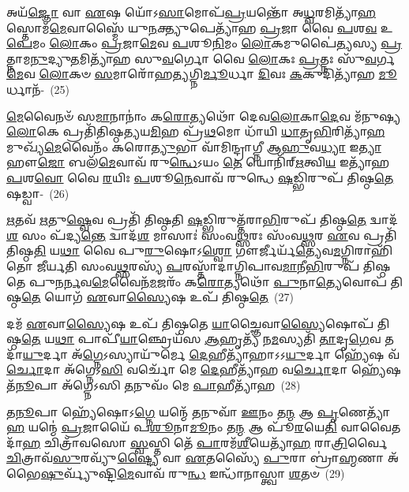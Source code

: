 {\anuvakamend[{\-\ul{𑌭𑍂}\-\-\ul{𑌯𑌾}\-\-\ul{𑌸𑍍𑌤} \ul{𑌸𑍍𑌵}\-𑌸𑍍𑌤𑌯𑍇\-𑌽𑌗𑍍𑌨𑍇᳴ 𑌪𑍁𑌷𑍍𑌯𑌾𑌸𑌂 \ul{𑌧𑍃}\-𑌷𑌦𑍍𑌵᳴\-\ul{𑌰𑍍𑌣}\-𑌮𑍇\-\ul{𑌕𑌾}\-𑌨𑍍𑌨\-\ul{𑌤𑍍𑌰𑌿}\-\-\ul{𑍞}\-𑌶𑌚𑍍𑌚᳴}]}%

𑌅𑌯᳴\-\ul{𑌜𑍍𑌞𑍋} 𑌵𑌾 \ul{𑌏}\-𑌷 𑌯𑍋᳴\-𑌽\-\ul{𑌸𑌾}\-𑌮𑍋𑌪᳴\-\ul{𑌪𑍍𑌰}\-𑌯𑌨𑍍𑌤𑍋᳴ 𑌅\-\ul{𑌧𑍍𑌵}\-𑌰𑌮𑌿𑌤𑍍𑌯𑌾᳴\-\ul{𑌹} 𑌸𑍍𑌤𑍋𑌮᳴\-\ul{𑌮𑍇}\-𑌵𑌾𑌸𑍍𑌮𑍈᳴ 𑌯𑍁\-\ul{𑌨}\-𑌕𑍍𑌤𑍍𑌯𑍁𑌪𑍇𑌤𑍍𑌯𑌾᳴𑌹 \ul{𑌪𑍍𑌰}\-𑌜𑌾 𑌵𑍈 \ul{𑌪}\-𑌶\-\ul{𑌵} 𑌉\-\ul{𑌪𑍇}\-𑌮𑌂 \ul{𑌲𑍋}\-𑌕𑌂 \ul{𑌪𑍍𑌰}\-𑌜𑌾\-\ul{𑌮𑍇}\-𑌵 \ul{𑌪}\-𑌶𑍂\-\ul{𑌨𑌿}\-𑌮𑌂 \ul{𑌲𑍋}\-𑌕𑌮𑍁𑌪𑍈॑\-\ul{𑌤𑍍𑌯}\-𑌸𑍍𑌯 \ul{𑌪𑍍𑌰}\-𑌤𑍍𑌨𑌾𑌮\-\ul{𑌨𑍁}\-𑌦𑍍𑌯𑍁\-\ul{𑌤}\-𑌮𑌿𑌤𑍍𑌯𑌾᳴𑌹 𑌸𑍁\-\ul{𑌵}\-𑌰𑍍𑌗𑍋 𑌵𑍈 \ul{𑌲𑍋}\-𑌕𑌃 \ul{𑌪𑍍𑌰}\-𑌤𑍍𑌨𑌃 𑌸𑍁᳴\-\ul{𑌵}\-𑌰𑍍𑌗\-\ul{𑌮𑍇}\-𑌵 \ul{𑌲𑍋}\-𑌕𑍞 \ul{𑌸}\-𑌮𑌾𑌰𑍋᳴𑌹\-\ul{𑌤𑍍𑌯}\-𑌗𑍍𑌨𑌿\-\ul{𑌰𑍍𑌮𑍂}\-𑌰𑍍𑌧𑌾 \ul{𑌦𑌿}\-𑌵𑌃 \ul{𑌕}\-𑌕𑍁𑌦𑌿𑌤𑍍𑌯𑌾᳴𑌹 \ul{𑌮𑍂}\-𑌰𑍍𑌧𑌾𑌨᳴-~(25)

\-\ul{𑌮𑍇}\-𑌵𑍈𑌨𑍞᳴ 𑌸\-\ul{𑌮𑌾}\-𑌨𑌾𑌨𑌾𑌂॑ 𑌕\-\ul{𑌰𑍋}\-𑌤𑍍𑌯𑌥𑍋᳴ 𑌦𑍇𑌵\-\ul{𑌲𑍋}\-𑌕𑌾\-\ul{𑌦𑍇}\-𑌵 𑌮᳴𑌨𑍁𑌷𑍍𑌯\-\ul{𑌲𑍋}\-𑌕𑍇 𑌪𑍍𑌰𑌤𑌿᳴𑌤𑌿𑌷𑍍𑌠\-\ul{𑌤𑍍𑌯}\-𑌯\-\ul{𑌮𑌿}\-𑌹 𑌪𑍍𑌰᳴\-\ul{𑌥}\-𑌮𑍋 𑌧𑌾᳴𑌯𑌿 \ul{𑌧𑌾}\-𑌤𑍃\-\ul{𑌭𑌿}\-𑌰𑌿𑌤𑍍𑌯𑌾᳴\-\ul{𑌹} 𑌮𑍁𑌖𑍍𑌯᳴\-\ul{𑌮𑍇}\-𑌵𑍈𑌨𑌂᳴ 𑌕𑌰𑍋\-\ul{𑌤𑍍𑌯𑍁}\-𑌭𑌾 𑌵𑌾᳴𑌮𑌿𑌨𑍍𑌦𑍍𑌰𑌾𑌗𑍍𑌨𑍀 𑌆\-\ul{𑌹𑍁}\-𑌵\-\ul{𑌧𑍍𑌯𑌾} 𑌇\-\ul{𑌤𑍍𑌯𑌾}\-𑌹𑍗\-\ul{𑌜𑍋} 𑌬𑌲᳴\-\ul{𑌮𑍇}\-𑌵𑌾𑌵᳴ 𑌰𑍁\-\ul{𑌨𑍍𑌧𑍇}\-\-𑌽𑌯𑌂 \ul{𑌤𑍇} 𑌯𑍋𑌨𑌿᳴𑌰𑍍\mbox{}\-\ul{𑌋}\-𑌤𑍍𑌵𑌿\-\ul{𑌯} 𑌇𑌤𑍍𑌯𑌾᳴𑌹 \ul{𑌪}\-𑌶\-\ul{𑌵𑍋} 𑌵𑍈 \ul{𑌰}\-𑌯𑌿𑌃 \ul{𑌪}\-𑌶𑍂\-\ul{𑌨𑍇}\-𑌵𑌾𑌵᳴ 𑌰𑍁𑌨𑍍𑌧𑍇 \ul{𑌷}\-𑌡𑍍𑌭𑌿𑌰𑍁𑌪᳴ 𑌤𑌿𑌷𑍍𑌠\-\ul{𑌤𑍇} 𑌷𑌡𑍍𑌵𑌾-~(26)

\-\ul{𑌋}\-𑌤𑌵᳴ \ul{𑌋}\-𑌤𑍁\-\ul{𑌷𑍍𑌵𑍇}\-𑌵 𑌪𑍍𑌰𑌤𑌿᳴ 𑌤𑌿𑌷𑍍𑌠𑌤𑌿 \ul{𑌷}\-𑌡𑍍𑌭𑌿𑌰𑍁𑌤𑍍𑌤᳴𑌰𑌾\-\ul{𑌭𑌿}\-𑌰𑍁𑌪᳴ 𑌤𑌿𑌷𑍍𑌠\-\ul{𑌤𑍇} 𑌦𑍍𑌵𑌾𑌦᳴\-\ul{𑌶} 𑌸𑌂 𑌪᳴𑌦𑍍𑌯\-\ul{𑌨𑍍𑌤𑍇} 𑌦𑍍𑌵𑌾𑌦᳴\-\ul{𑌶} 𑌮𑌾𑌸𑌾𑌃॑ 𑌸𑌂𑌵\-\ul{𑌥𑍍𑌸}\-𑌰𑌃 𑌸𑌂᳴𑌵\-\ul{𑌥𑍍𑌸}\-𑌰 \ul{𑌏}\-𑌵 𑌪𑍍𑌰𑌤𑌿᳴ 𑌤𑌿𑌷𑍍𑌠\-\ul{𑌤𑌿} 𑌯\-\ul{𑌥𑌾} 𑌵𑍈 𑌪𑍁\-\ul{𑌰𑍁}\-𑌷𑍋\-𑌽\-\ul{𑌶𑍍𑌵𑍋} 𑌗𑍗𑌰𑍍𑌜𑍀𑌰𑍍𑌯᳴\-\ul{𑌤𑍍𑌯𑍇}\-𑌵\-\ul{𑌮}\-𑌗𑍍𑌨𑌿𑌰𑌾𑌹𑌿᳴𑌤𑍋 𑌜𑍀𑌰𑍍𑌯𑌤𑌿 𑌸𑌂𑌵\-\ul{𑌥𑍍𑌸}\-𑌰𑌸𑍍𑌯᳴ \ul{𑌪}\-𑌰𑌸𑍍𑌤𑌾᳴𑌦𑌾𑌗𑍍𑌨𑌿𑌪𑌾𑌵\-\ul{𑌮𑌾}\-𑌨𑍀\-\ul{𑌭𑌿}\-𑌰𑍁𑌪᳴ 𑌤𑌿𑌷𑍍𑌠𑌤𑍇 𑌪𑍁𑌨\-\ul{𑌰𑍍𑌨}\-𑌵\-\ul{𑌮𑍇}\-𑌵𑍈𑌨᳴\-\ul{𑌮}\-𑌜𑌰𑌂᳴ 𑌕\-\ul{𑌰𑍋}\-𑌤𑍍𑌯𑌥𑍋᳴ \ul{𑌪𑍁}\-𑌨𑌾\-\ul{𑌤𑍍𑌯𑍇}\-𑌵𑍋𑌪᳴ 𑌤𑌿𑌷𑍍𑌠\-\ul{𑌤𑍇} 𑌯𑍋𑌗᳴ \ul{𑌏}\-𑌵𑌾\-\ul{𑌸𑍍𑌯𑍈}\-𑌷 𑌉𑌪᳴ 𑌤𑌿𑌷𑍍𑌠\-\ul{𑌤𑍇}\-~(27)

𑌦𑌮᳴ \ul{𑌏}\-𑌵𑌾\-\ul{𑌸𑍍𑌯𑍈}\-𑌷 𑌉𑌪᳴ 𑌤𑌿𑌷𑍍𑌠𑌤𑍇 \ul{𑌯𑌾}\-𑌚𑍍𑌞𑍈𑌵𑌾\-\ul{𑌸𑍍𑌯𑍈}\-𑌷𑍋𑌪᳴ 𑌤𑌿𑌷𑍍𑌠\-\ul{𑌤𑍇} 𑌯\-\ul{𑌥𑌾} 𑌪𑌾𑌪𑍀᳴\-\ul{𑌯𑌾}\-𑌞𑍍𑌛𑍍𑌰𑍇𑌯᳴𑌸 \ul{𑌆}\-𑌹𑍃𑌤𑍍𑌯᳴ 𑌨\-\ul{𑌮}\-𑌸𑍍𑌯𑌤𑌿᳴ \ul{𑌤𑌾}\-𑌦𑍃\-\ul{𑌗𑍇}\-𑌵 𑌤𑌦𑌾᳴\-\ul{𑌯𑍁}\-𑌰𑍍𑌦𑌾 𑌅᳴\-\ul{𑌗𑍍𑌨𑍇}\-\-𑌽𑌸𑍍𑌯𑌾𑌯𑍁᳴𑌰𑍍𑌮𑍇 \ul{𑌦𑍇}\-𑌹𑍀𑌤𑍍𑌯𑌾᳴𑌹𑌾\-𑌽\-𑌽\-\ul{𑌯𑍁}\-𑌰𑍍𑌦𑌾 𑌹𑍍𑌯𑍇᳴𑌷 𑌵᳴\-\ul{𑌰𑍍𑌚𑍋}\-𑌦𑌾 𑌅᳴𑌗𑍍𑌨𑍇\-𑌽\-\ul{𑌸𑌿} 𑌵𑌰𑍍𑌚𑍋᳴ 𑌮𑍇 \ul{𑌦𑍇}\-𑌹𑍀𑌤𑍍𑌯𑌾᳴𑌹 𑌵\-\ul{𑌰𑍍𑌚𑍋}\-𑌦𑌾 𑌹𑍍𑌯𑍇᳴𑌷 𑌤᳴\-\ul{𑌨𑍂}\-𑌪𑌾 𑌅᳴𑌗𑍍𑌨𑍇\-𑌽𑌸𑌿 \ul{𑌤}\-𑌨𑍁𑌵𑌂᳴ 𑌮𑍇 \ul{𑌪𑌾}\-𑌹𑍀𑌤𑍍𑌯𑌾᳴𑌹~(28)

𑌤\-\ul{𑌨𑍂}\-𑌪𑌾 𑌹𑍍𑌯𑍇᳴𑌷𑍋\-𑌽\-\ul{𑌗𑍍𑌨𑍇} 𑌯𑌨𑍍𑌮𑍇᳴ \ul{𑌤}\-𑌨𑍁𑌵𑌾᳴ \ul{𑌊}\-𑌨𑌂 𑌤\-\ul{𑌨𑍍𑌮} 𑌆 \ul{𑌪𑍃}\-𑌣𑍇𑌤𑍍𑌯𑌾᳴\-\ul{𑌹} 𑌯𑌨𑍍𑌮𑍇॑ \ul{𑌪𑍍𑌰}\-𑌜𑌾𑌯𑍈᳴ 𑌪\-\ul{𑌶𑍂}\-𑌨𑌾\-\ul{𑌮𑍂}\-𑌨𑌂 𑌤\-\ul{𑌨𑍍𑌮} 𑌆 𑌪𑍂᳴\-\ul{𑌰}\-𑌯𑍇\-\ul{𑌤𑌿} 𑌵𑌾𑌵𑍈𑌤𑌦𑌾᳴\-\ul{𑌹} 𑌚𑌿𑌤𑍍𑌰𑌾᳴𑌵𑌸𑍋 \ul{𑌸𑍍𑌵}\-𑌸𑍍𑌤𑌿 𑌤𑍇᳴ \ul{𑌪𑌾}\-𑌰𑌮᳴\-\ul{𑌶𑍀}\-𑌯𑍇𑌤𑍍𑌯𑌾᳴\-\ul{𑌹} 𑌰𑌾\-\ul{𑌤𑍍𑌰𑌿}\-𑌰𑍍𑌵𑍈 \ul{𑌚𑌿}\-𑌤𑍍𑌰𑌾𑌵᳴\-\ul{𑌸𑍁}\-𑌰𑌵𑍍𑌯𑍁᳴\-\ul{𑌷𑍍𑌟𑍍𑌯𑍈} 𑌵𑌾 \ul{𑌏}\-𑌤𑌸𑍍𑌯𑍈᳴ \ul{𑌪𑍁}\-𑌰𑌾 𑌬𑍍𑌰𑌾॑\-\ul{𑌹𑍍𑌮}\-𑌣𑌾 𑌅᳴𑌭𑍈\-\ul{𑌷𑍁}\-𑌰𑍍𑌵𑍍𑌯𑍁᳴𑌷𑍍𑌟𑌿\-\ul{𑌮𑍇}\-𑌵𑌾𑌵᳴ 𑌰𑍁\-\ul{𑌨𑍍𑌧} 𑌇𑌨𑍍𑌧𑌾᳴𑌨𑌾𑌸𑍍𑌤𑍍𑌵𑌾 \ul{𑌶}\-𑌤𑍞~(29)

